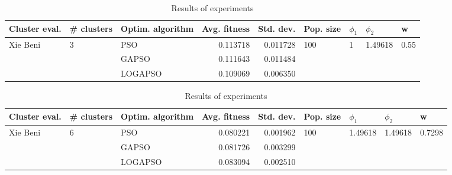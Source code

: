\documentclass{article}
\begin{document}
\begin{table}
\centering
\caption{Results of experiments}
\begin{tabular}{lllrrllll}
\toprule
            Cluster eval. &        \# clusters & Optim. algorithm &  Avg. fitness &  Std. dev. &            Pop. size &         $\phi_{1}$ &               $\phi_{2}$ &                     w \\
\midrule
\multirow{3}{*}{Xie Beni} & \multirow{3}{*}{3} &              PSO &      0.113718 &   0.011728 & \multirow{3}{*}{100} & \multirow{3}{*}{1} & \multirow{3}{*}{1.49618} & \multirow{3}{*}{0.55} \\
                          &                    &            GAPSO &      0.111643 &   0.011484 &                      &                    &                          &                       \\
                          &                    &          LOGAPSO &      0.109069 &   0.006350 &                      &                    &                          &                       \\
\bottomrule
\end{tabular}
\end{table}
\begin{table}
\centering
\caption{Results of experiments}
\begin{tabular}{lllrrllll}
\toprule
            Cluster eval. &        \# clusters & Optim. algorithm &  Avg. fitness &  Std. dev. &            Pop. size &               $\phi_{1}$ &               $\phi_{2}$ &                       w \\
\midrule
\multirow{3}{*}{Xie Beni} & \multirow{3}{*}{6} &              PSO &      0.080221 &   0.001962 & \multirow{3}{*}{100} & \multirow{3}{*}{1.49618} & \multirow{3}{*}{1.49618} & \multirow{3}{*}{0.7298} \\
                          &                    &            GAPSO &      0.081726 &   0.003299 &                      &                          &                          &                         \\
                          &                    &          LOGAPSO &      0.083094 &   0.002510 &                      &                          &                          &                         \\
\bottomrule
\end{tabular}
\end{table}
\end{document}
